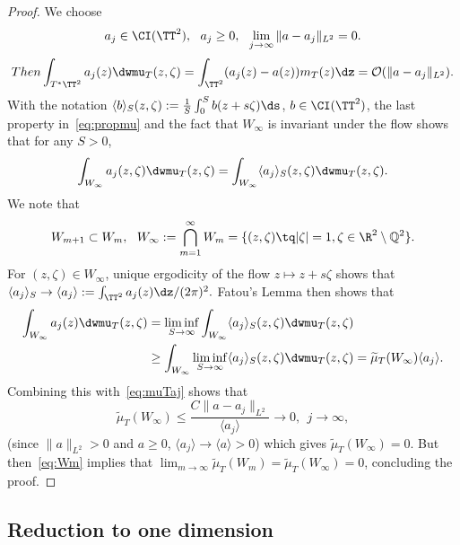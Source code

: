 \begin{proof}
We choose
\begin{equation}\label{eq:aj}
a_j \in \CI (\TT^2), \ \ a_j \geq 0, \ \
\lim_{ j \to \infty } \| a - a_j\|_{L^2 } = 0.
\end{equation}
\begin{equation}
Then\label{eq:muTaj}
\int_{T^* \TT^2 } a_j (z) \dwmu_T (z,\zeta) = \int_{ \TT^2 } (a_j (z) - a (z)) m_T (z) \dz = \mathcal O (\| a - a_j \|_{L^2 }).
\end{equation}
With the notation $ \langle b \rangle_S (z, \zeta) := \frac{1}{S} \int_{ 0}^S b (z + s \zeta) \ds $, $ b \in \CI (\TT^2) $, the last property in~\eqref{eq:propmu} and the fact that $ W_\infty $ is invariant under the flow shows that for any $ S > 0 $,
\[
\int_{W_\infty } a_j (z,\zeta) \dwmu_T (z,\zeta) =
\int_{W_\infty } \langle a_j \rangle_S (z, \zeta) \dwmu_T (z,\zeta).
\]
We note that
\begin{equation}\label{eq:Wm}
W_{m+1} \subset W_m, \ \ W_\infty := \bigcap_{ m =1}^\infty W_m = \{(z, \zeta) \tq |\zeta|=1,
\zeta \in \R^2 \setminus \mathbb Q^2 \}.
\end{equation}
For $ (z, \zeta) \in W_\infty $, unique ergodicity of the flow $ z \mapsto z + s \zeta $ shows that $ \langle a_j \rangle_S \to \langle a_j
\rangle := \int_{\TT^2} a_j (z) \dz / (2 \pi)^2. $ Fatou's Lemma then shows that
\[
\begin{split} \int_{W_\infty } a_j (z) \dwmu_T (z,\zeta)
& = \liminf_{ S \to \infty } \int_{W_\infty } \langle a_j \rangle_S (z, \zeta) \dwmu_T (z,\zeta) \\
& \geq \int_{W_\infty} \liminf_{ S \to \infty } \langle a_j \rangle_S (z, \zeta) \dwmu_T (z,\zeta) = \widetilde \mu_T (W_\infty) \langle a_j \rangle.
\end{split}
\]
Combining this with~\eqref{eq:muTaj} shows that
\[
\widetilde \mu_T (W_\infty) \leq \frac{ C \| a - a_j \|_{L^2 } } {\langle a_j \rangle} \rightarrow 0, \ \ j \to \infty,
\]
(since $ \| a \|_{L^2 } > 0 $ and $ a \geq 0 $, $ \langle a_j \rangle
\to \langle a \rangle > 0 $) which gives $ \widetilde \mu_T (W_\infty) = 0 $. But then~\eqref{eq:Wm} implies that $ \lim_{ m \to \infty } \widetilde \mu_T (W_m) = \widetilde \mu_T (W_\infty) = 0 $, concluding the proof.
\end{proof}

\subsection{Reduction to one dimension}

